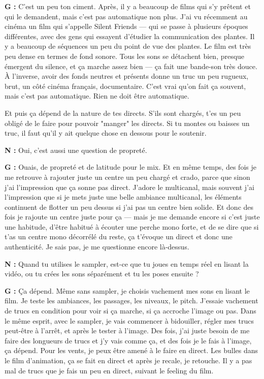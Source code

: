 ﻿\documentclass[12pt]{article}
\begin{document}
\textbf{G :} C'est un peu ton ciment. Après, il y a beaucoup de films qui s'y prêtent et qui le demandent, mais c'est pas automatique non plus. J'ai vu récemment au cinéma un film qui s'appelle Silent Friends — qui se passe à plusieurs époques différentes, avec des gens qui essayent d'étudier la communication des plantes. Il y a beaucoup de séquences un peu du point de vue des plantes. Le film est très peu dense en termes de fond sonore. Tous les sons se détachent bien, presque émergent du silence, et ça marche assez bien — ça fait une bande-son très douce. À l'inverse, avoir des fonds neutres et présents donne un truc un peu rugueux, brut, un côté cinéma français, documentaire. C'est vrai qu'on fait ça souvent, mais c'est pas automatique. Rien ne doit être automatique. 

Et puis ça dépend de la nature de tes directs. S'ils sont chargés, t'es un peu obligé de le faire pour pouvoir "manger" les directs. Si tu montes ou baisses un truc, il faut qu'il y ait quelque chose en dessous pour le soutenir. 

\textbf{N :} Oui, c'est aussi une question de propreté. 

\textbf{G :} Ouais, de propreté et de latitude pour le mix. Et en même temps, des fois je me retrouve à rajouter juste un centre un peu chargé et crado, parce que sinon j'ai l'impression que ça sonne pas direct. J'adore le multicanal, mais souvent j'ai l'impression que si je mets juste une belle ambiance multicanal, les éléments continuent de flotter un peu dessus si j'ai pas un centre bien solide. Et donc des fois je rajoute un centre juste pour ça — mais je me demande encore si c'est juste une habitude, d'être habitué à écouter une perche mono forte, et de se dire que si t'as un centre mono décorrélé du reste, ça t'évoque un direct et donc une authenticité. Je sais pas, je me questionne encore là-dessus. 

\textbf{N :} Quand tu utilises le sampler, est-ce que tu joues en temps réel en lisant la vidéo, ou tu crées les sons séparément et tu les poses ensuite ? 

\textbf{G :} Ça dépend. Même sans sampler, je choisis vachement mes sons en lisant le film. Je teste les ambiances, les passages, les niveaux, le pitch. J'essaie vachement de trucs en condition pour voir si ça marche, si ça accroche l'image ou pas. Dans le même esprit, avec le sampler, je vais commencer à bidouiller, régler mes trucs peut-être à l'arrêt, et après le tester à l'image. Des fois, j'ai juste besoin de me faire des longueurs de trucs et j'y vais comme ça, et des fois je le fais à l'image, ça dépend. Pour les vents, je peux être amené à le faire en direct. Les bulles dans le film d'animation, ça se fait en direct et après je recale, je retouche. Il y a pas mal de trucs que je fais un peu en direct, suivant le feeling du film. 
\end{document}
